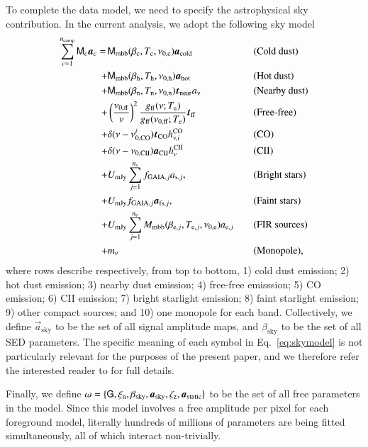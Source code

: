 \documentclass{aa}
\renewcommand{\t}[0]{\vec{t}}
\newcommand{\G}[0]{\tens{G}}
\renewcommand{\a}[0]{\vec{a}}
\newcommand{\M}[0]{\tens{M}}
\newcommand{\Te}[0]{T_{\rm e}}
\def\Tcold{\ifmmode T_\mathrm{c}\else $T_{\mathrm{c}}$\fi}
\def\Thot{\ifmmode T_\mathrm{h}\else $T_{\mathrm{h}}$\fi}
\def\Tnear{\ifmmode T_\mathrm{n}\else $T_{\mathrm{n}}$\fi}
\def\bcold{\ifmmode \beta_\mathrm{c}\else $\beta_{\mathrm{c}}$\fi}
\def\bhot{\ifmmode \beta_\mathrm{h}\else $\beta_{\mathrm{h}}$\fi}
\def\bnear{\ifmmode \beta_\mathrm{n}\else $\beta_{\mathrm{n}}$\fi}
\def\nuzeroff{\ifmmode \nu_{0,\mathrm{ff}}\else $\nu_{0,\mathrm{ff}}$\fi}
\def\nuzerocold{\ifmmode \nu_{0,\mathrm{c}}\else $\nu_{0,\mathrm{c}}$\fi}
\def\nuzerohot{\ifmmode \nu_{0,\mathrm{h}}\else $\nu_{0,\mathrm{h}}$\fi}
\def\nuzeronear{\ifmmode \nu_{0,\mathrm{n}}\else $\nu_{0,\mathrm{n}}$\fi}
\def\Te{\ifmmode T_{\mathrm{e}}\else $T_{\mathrm{e}}$\fi}
\begin{document}
To complete the data model, we need to specify the astrophysical sky
contribution. In the current analysis, we adopt the following sky model
\begin{alignat}{4}
  \sum_{c=1}^{n_{\mathrm{comp}}} \M_c \a_c  = \,
  &\M_{\mathrm{mbb}}(\bcold,\Tcold,\nuzerocold)\vec{a}_{\mathrm{cold}}
  && \textrm{(Cold dust)}\label{eq:skymodel}\\
  + &\M_{\mathrm{mbb}}(\bhot,\Thot,\nuzerohot)
  \vec{a}_{\mathrm{hot}} && \textrm{(Hot dust)}\nonumber \\
  + &\M_{\mathrm{mbb}}(\bnear,\Tnear,\nuzeronear) \t_{\mathrm{near}}
  a_{\nu} && \textrm{(Nearby dust)} \nonumber \\
  + &\left(\frac{\nuzeroff}{\nu}\right)^2
  \frac{g_{\mathrm{ff}}(\nu;\Te) }{g_{\mathrm{ff}}(\nuzeroff;\Te)}
  \vec{t}_{\mathrm{ff}} && \textrm{(Free-free)} \nonumber\\
  + &\delta(\nu-\nu_{0,\mathrm{CO}}^i) \t_{\mathrm{CO}}
  h^{\mathrm{CO}}_{\nu,i} && \textrm{(CO)}\nonumber\\
  + &\delta(\nu-\nu_{0,\mathrm{CII}}) \a_{\mathrm{CII}}
  h^{\mathrm{CII}}_{\nu} && \textrm{(CII)}\nonumber \\
  + &U_{\mathrm{mJy}} \sum_{j=1}^{n_{\mathrm{s}}}
  f_{\mathrm{GAIA},j} a_{\mathrm{s},j}, &\quad&
  \textrm{(Bright stars)} \nonumber\\
  + &U_{\mathrm{mJy}} f_{\mathrm{GAIA},j} \a_{\mathrm{fs},j}, &\quad&
  \textrm{(Faint stars)} \nonumber\\  
    + &U_{\mathrm{mJy}} \sum_{j=1}^{n_{\mathrm{e}}}
  M_{\mathrm{mbb}}(\beta_{\mathrm{e},j},
  T_{\mathrm{e},j}, \nu_{0,\mathrm{e}})
  a_{\mathrm{e},j} && \textrm{(FIR sources)}\nonumber\\
  + &m_{\nu} && \textrm{(Monopole)}, \nonumber
\end{alignat}
where rows describe respectively, from top to bottom, 1) cold dust
emission; 2) hot dust emission; 3) nearby dust emission; 4) free-free
emisssion; 5) CO emission; 6) CII emission; 7) bright starlight
emission; 8) faint starlight emission; 9) other compact sources; and
10) one monopole for each band. Collectively, we define
$\a_{\mathrm{sky}}$ to be the set of all signal amplitude maps, and
$\beta_{\mathrm{sky}}$ to be the set of all SED parameters. The
specific meaning of each symbol in Eq.~\eqref{eq:skymodel} is not
particularly relevant for the purposes of the present paper, and we
therefore refer the interested reader to \citet{CG02_04,CG02_05} for
full details.


Finally, we define $\omega = \{\G,\xi_{\mathrm{n}},
\beta_{\mathrm{sky}},\a_{\mathrm{sky}},\zeta_{\mathrm{z}},\a_{\mathrm{static}}\}$
to be the set of all free parameters in the model. Since this model involves
a free amplitude per pixel for each foreground model, literally
hundreds of millions of parameters are being fitted simultaneously,
all of which interact non-trivially.
\end{document}
